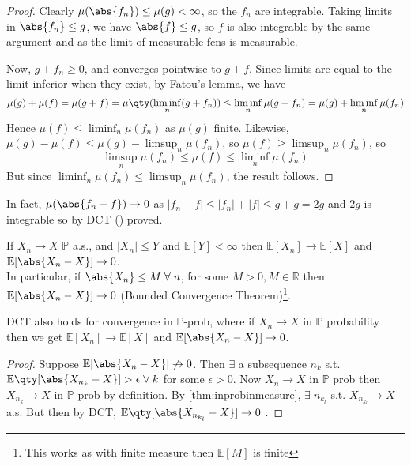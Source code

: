 \begin{proof}
	Clearly $\mu(\abs{f_n}) \leq \mu(g) < \infty$, so the $f_n$ are integrable.
	Taking limits in $\abs{f_n} \leq g$, we have $\abs{f} \leq g$, so $f$ is also integrable by the same argument and as the limit of measurable fcns is measurable.

	Now, $g \pm f_n \geq 0$, and converges pointwise to $g \pm f$.
	Since limits are equal to the limit inferior when they exist, by Fatou's lemma, we have
	\[ \mu(g) + \mu(f) = \mu(g + f) = \mu\qty(\liminf_n (g + f_n)) \leq \liminf_n \mu(g + f_n) = \mu(g) + \liminf_n \mu(f_n) \]
	Hence $\mu(f) \leq \liminf_n \mu(f_n)$ as $\mu(g)$ finite.
	Likewise, $\mu(g) - \mu(f) \leq \mu(g) - \limsup_n \mu(f_n)$, so $\mu(f) \geq \limsup_n \mu(f_n)$, so
	\[ \limsup_n \mu(f_n) \leq \mu(f) \leq \liminf_n \mu(f_n) \]
	But since $\liminf_n \mu(f_n) \leq \limsup_n \mu(f_n)$, the result follows.
\end{proof}

\begin{remark}
	In fact, $\mu(\abs{f_n - f}) \to 0$ as $|f_n - f| \leq |f_n| + |f| \leq g + g = 2g$ and $2g$ is integrable so by DCT () proved.

	If $X_n \to X$ $\mathbb{P}$ a.s., and $|X_n| \leq Y$ and $\mathbb{E}[Y] < \infty$ then $\mathbb{E}[X_n] \to \mathbb{E}[X]$ and $\mathbb{E}[\abs{X_n - X}] \to 0$. \\
	In particular, if $\abs{X_n} \leq M \; \forall \; n$, for some $M > 0, M \in \mathbb{R}$ then $\mathbb{E}[\abs{X_n - X}] \to 0$ (Bounded Convergence Theorem)\footnote{This works as with finite measure then $\mathbb{E}[M]$ is finite}.
\end{remark}

\begin{remark}
	DCT also holds for convergence in $\mathbb{P}$-prob, where if $X_n \to X$ in $\mathbb{P}$ probability then we get $\mathbb{E}[X_n] \to \mathbb{E}[X]$ and $\mathbb{E}[\abs{X_n - X}] \to 0$.
\end{remark}

\begin{proof}
	Suppose $\mathbb{E}[\abs{X_n - X}] \not\to 0$.
	Then $\exists$ a subsequence $n_k$ s.t. $\mathbb{E}\qty[\abs{X_{n_k} - X}] > \epsilon \; \forall \; k$ for some $\epsilon > 0$.
	Now $X_n \to X$ in $\mathbb{P}$ prob then $X_{n_k} \to X$ in $\mathbb{P}$ prob by definition.
	By \cref{thm:inprobinmeasure}, $\exists \; n_{k_{l}}$ s.t. $X_{n_{k_l}} \to X$ a.s.
	But then by DCT, $\mathbb{E}\qty[\abs{X_{n_{k_l}} - X}] \to 0$ \Lightning.
\end{proof}

